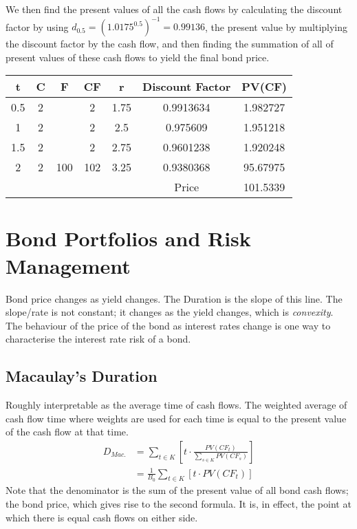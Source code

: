 \documentclass[a4paper]{article}
\begin{document}
We then find the present values of all the cash flows by calculating the discount
factor by using $d_0.5 = (1.0175^{0.5})^{-1} = 0.99136$, the present value by multiplying
the discount factor by the cash flow, and then finding the summation of all of
present values of these cash flows to yield the final bond price.
\begin{center}
\begin{tabular}{|c|c|c|c|c|c|c|}
\hline
t   & C & F   & CF  & r    & Discount Factor & PV(CF)   \\ \hline
0.5 & 2 &     & 2   & 1.75 & 0.9913634       & 1.982727 \\ \hline
1   & 2 &     & 2   & 2.5  & 0.975609        & 1.951218 \\ \hline
1.5 & 2 &     & 2   & 2.75 & 0.9601238       & 1.920248 \\ \hline
2   & 2 & 100 & 102 & 3.25 & 0.9380368       & 95.67975 \\ \hline
    &   &     &     &      & Price           & 101.5339 \\ \hline
\end{tabular}
\end{center}


\section{Bond Portfolios and Risk Management}
Bond price changes as yield changes. The Duration is the slope of this line.
The slope/rate is not constant; it changes as the yield changes, which is
\emph{convexity}. The behaviour of the price of the bond as interest rates
change is one way to characterise the interest rate risk of a bond.

\subsection{Macaulay's Duration}
Roughly interpretable as the average time of cash flows. The weighted average
of cash flow time where weights are used for each time is equal to the present
value of the cash flow at that time.
\begin{align*}
D_{Mac.} &= \sum_{t \in K} \left [ t \cdot \frac{PV(CF_t)}{\sum_{s \in K} PV(CF_s)} \right ]\\
&= \frac{1}{B_0} \sum_{t\in K} [t \cdot PV(CF_t)]
\end{align*}
Note that the denominator is the sum of the present value of all bond cash flows;
the bond price, which gives rise to the second formula. It is, in effect, 
the point at which there is equal cash flows on either side.
\end{document}
